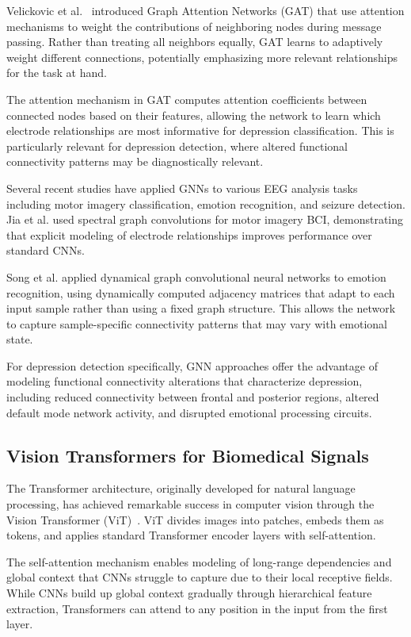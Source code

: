 \documentclass[blue,fullpaper]{ludusofficial}  %
\begin{document}
Velickovic et al.~\cite{velickovic2018graph} introduced Graph Attention Networks (GAT) that use attention mechanisms to weight the contributions of neighboring nodes during message passing. Rather than treating all neighbors equally, GAT learns to adaptively weight different connections, potentially emphasizing more relevant relationships for the task at hand.

The attention mechanism in GAT computes attention coefficients between connected nodes based on their features, allowing the network to learn which electrode relationships are most informative for depression classification. This is particularly relevant for depression detection, where altered functional connectivity patterns may be diagnostically relevant.

Several recent studies have applied GNNs to various EEG analysis tasks including motor imagery classification, emotion recognition, and seizure detection. Jia et al. used spectral graph convolutions for motor imagery BCI, demonstrating that explicit modeling of electrode relationships improves performance over standard CNNs.

Song et al. applied dynamical graph convolutional neural networks to emotion recognition, using dynamically computed adjacency matrices that adapt to each input sample rather than using a fixed graph structure. This allows the network to capture sample-specific connectivity patterns that may vary with emotional state.

For depression detection specifically, GNN approaches offer the advantage of modeling functional connectivity alterations that characterize depression, including reduced connectivity between frontal and posterior regions, altered default mode network activity, and disrupted emotional processing circuits.

\subsection{Vision Transformers for Biomedical Signals}

The Transformer architecture, originally developed for natural language processing, has achieved remarkable success in computer vision through the Vision Transformer (ViT)~\cite{dosovitskiy2021image}. ViT divides images into patches, embeds them as tokens, and applies standard Transformer encoder layers with self-attention.

The self-attention mechanism enables modeling of long-range dependencies and global context that CNNs struggle to capture due to their local receptive fields. While CNNs build up global context gradually through hierarchical feature extraction, Transformers can attend to any position in the input from the first layer.
\end{document}
